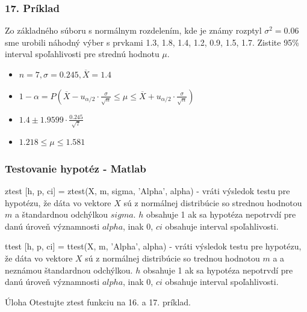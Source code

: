 \documentclass{beamer}
\begin{document}
\begin{frame}
\frametitle{17. Príklad}

Zo základného súboru s normálnym rozdelením, kde je známy rozptyl $\sigma^2 = 0.06$ sme urobili náhodný výber s prvkami 1.3, 1.8, 1.4, 1.2, 0.9, 1.5, 1.7. Zistite 95\% interval spoľahlivosti pre strednú hodnotu $\mu$.

\begin{itemize}
\item<2-> $n = 7, \sigma  = 0.245, \overline{X} = 1.4$
\item<3-> $1 - \alpha = P(\overline{X} - u_{\alpha/2} \cdot \frac{\sigma}{\sqrt{n}} \leq \mu \leq \overline{X} + u_{\alpha/2} \cdot \frac{\sigma}{\sqrt{n}})$
\item<4-> $1.4 \pm 1.9599 \cdot \frac{0.245}{\sqrt{7}}$
\item<5-> $1.218 \leq \mu \leq 1.581$
\end{itemize}
\end{frame}

\begin{frame}
\frametitle{Testovanie hypotéz - Matlab}

\begin{block}{ztest}
[h, p, ci] = ztest(X, m, sigma, 'Alpha', alpha) - vráti výsledok testu pre hypotézu, že dáta vo vektore $X$ sú z normálnej distribúcie so strednou hodnotou $m$ a štandardnou odchýlkou $sigma$. $h$ obsahuje 1 ak sa hypotéza nepotrvdí pre danú úroveň významnosti $alpha$, inak 0, $ci$ obsahuje interval spoľahlivosti.
\end{block}

\begin{block}{ttest}
[h, p, ci] = ttest(X, m, 'Alpha', alpha) - vráti výsledok testu pre hypotézu, že dáta vo vektore $X$ sú z normálnej distribúcie so trednou hodnotou $m$ a a neznámou štandardnou odchýlkou. $h$ obsahuje 1 ak sa hypotéza nepotrvdí pre danú úroveň významnosti $alpha$, inak 0, $ci$ obsahuje interval spoľahlivosti.
\end{block}

\begin{block}{Úloha}
Otestujte ztest funkciu na 16. a 17. príklad.
\end{block}
\end{frame}
\end{document}
